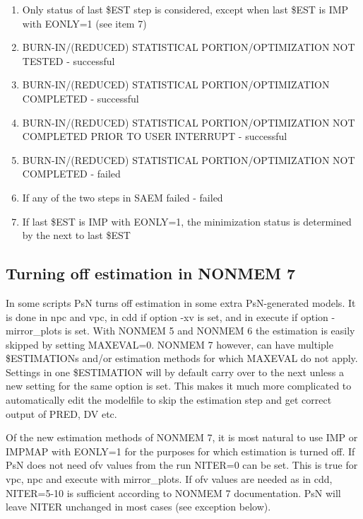 	\begin{enumerate}
		\item Only status of last \$EST step is considered, except when last \$EST is IMP with EONLY=1 (see item 7)
		\item BURN-IN/(REDUCED) STATISTICAL PORTION/OPTIMIZATION NOT TESTED - successful
		\item BURN-IN/(REDUCED) STATISTICAL PORTION/OPTIMIZATION COMPLETED - successful
		\item BURN-IN/(REDUCED) STATISTICAL PORTION/OPTIMIZATION NOT COMPLETED PRIOR TO USER INTERRUPT - successful
		\item BURN-IN/(REDUCED) STATISTICAL PORTION/OPTIMIZATION NOT COMPLETED - failed
		\item If any of the two steps in SAEM failed - failed 
		\item If last \$EST is IMP with EONLY=1, the minimization status is determined by the next to last \$EST
	\end{enumerate}
	
	\subsection{Turning off estimation in NONMEM 7}
	
	In some scripts PsN turns off estimation in some extra PsN-generated models. It is done in npc and vpc, in cdd if option -xv is set, and in execute if option -mirror\_plots is set. With NONMEM 5 and NONMEM 6 the estimation is easily skipped by setting MAXEVAL=0. NONMEM 7 however,  can have multiple \$ESTIMATIONs and/or estimation methods for which MAXEVAL do not apply. Settings in one \$ESTIMATION will by default carry over to the next unless a new setting for the same option is set. This makes it much more complicated to automatically edit the modelfile to skip the estimation step and get correct output of PRED, DV etc. 
	
	Of the new estimation methods of NONMEM 7, it is most natural to use IMP or IMPMAP with EONLY=1 for the purposes for which estimation is turned off. If PsN does not need ofv values from the run NITER=0 can be set. This is true for vpc, npc and execute with mirror\_plots. If ofv values are needed as in cdd, NITER=5-10 is sufficient according to NONMEM 7 documentation. PsN will leave NITER unchanged in most cases (see exception below).
	
